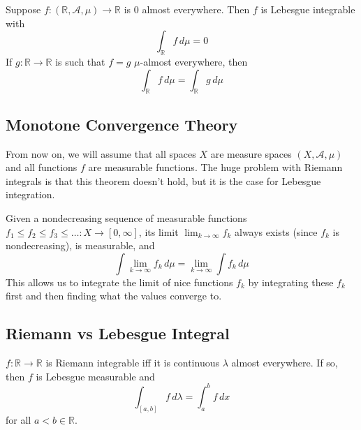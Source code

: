   \begin{theorem}
    Suppose $f: (\mathbb{R}, \mathcal{A}, \mu) \longrightarrow \mathbb{R}$ is $0$ almost everywhere. Then $f$ is Lebesgue integrable with 
    \begin{equation}
      \int_\mathbb{R} f \, d\mu = 0 
    \end{equation}
    If $g: \mathbb{R} \longrightarrow \mathbb{R}$ is such that $f = g$ $\mu$-almost everywhere, then
    \begin{equation}
      \int_\mathbb{R} f\, d\mu = \int_\mathbb{R} g \, d\mu
    \end{equation}
  \end{theorem}

\subsection{Monotone Convergence Theory}

  From now on, we will assume that all spaces $X$ are measure spaces $(X, \mathcal{A}, \mu)$ and all functions $f$ are measurable functions. The huge problem with Riemann integrals is that this theorem doesn't hold, but it is the case for Lebesgue integration. 

  \begin{theorem}
    Given a nondecreasing sequence of measurable functions $f_1 \leq f_2 \leq f_3 \leq \ldots : X \longrightarrow [0, \infty]$, its limit $\lim_{k \rightarrow \infty} f_k$ always exists (since $f_k$ is nondecreasing), is measurable, and 
    \begin{equation}
      \int \lim_{k \rightarrow \infty} f_k \, d\mu = \lim_{k \rightarrow \infty} \int f_k \, d\mu
    \end{equation}
    This allows us to integrate the limit of nice functions $f_k$ by integrating these $f_k$ first and then finding what the values converge to. 
  \end{theorem}

\subsection{Riemann vs Lebesgue Integral}

  \begin{theorem}
    $f: \mathbb{R} \longrightarrow \mathbb{R}$ is Riemann integrable iff it is continuous $\lambda$ almost everywhere. If so, then $f$ is Lebesgue measurable and 
    \begin{equation}
      \int_{[a, b]} f \,d\lambda = \int_a^b f \, dx
    \end{equation}
    for all $a < b \in \mathbb{R}$. 
  \end{theorem}

